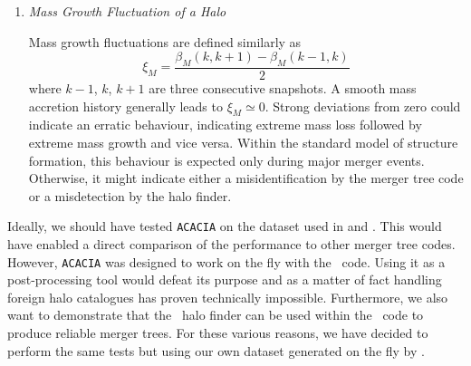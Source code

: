 \begin{enumerate}
\item \emph{Mass Growth Fluctuation of a Halo}
  
  Mass growth fluctuations are defined similarly as
  \begin{equation}
    \xi_M = \frac{\beta_M(k, k+1) - \beta_M(k-1, k)}{2} \label{eq:massfluct}
  \end{equation}
  where $k-1$, $k$, $k+1$ are three consecutive snapshots.  A smooth
  mass accretion history generally leads to $\xi_M \simeq 0$.  Strong
  deviations from zero could indicate an erratic behaviour, indicating
  extreme mass loss followed by extreme mass growth and vice versa.
  Within the standard model of structure formation, this behaviour is
  expected only during major merger events. Otherwise, it might
  indicate either a misidentification by the merger tree code or a
  misdetection by the halo finder.

 
\end{enumerate}

Ideally, we should have tested \texttt{ACACIA} on the dataset used in
\citet{SUSSING_COMPARISON} and \citet{SUSSING_HALOFINDER}.  This would
have enabled a direct comparison of the performance to other merger
tree codes.  However, \texttt{ACACIA} was designed to work on the fly
with the \ramses\ code.  Using it as a post-processing tool would
defeat its purpose and as a matter of fact handling foreign halo 
catalogues  has proven technically impossible.
Furthermore, we also want to demonstrate that the
\phew\ halo finder can be used within the \ramses\ code to produce
reliable merger trees.  For these various reasons, we have decided to
perform the same tests but using our own dataset generated on the fly by
\ramses.

